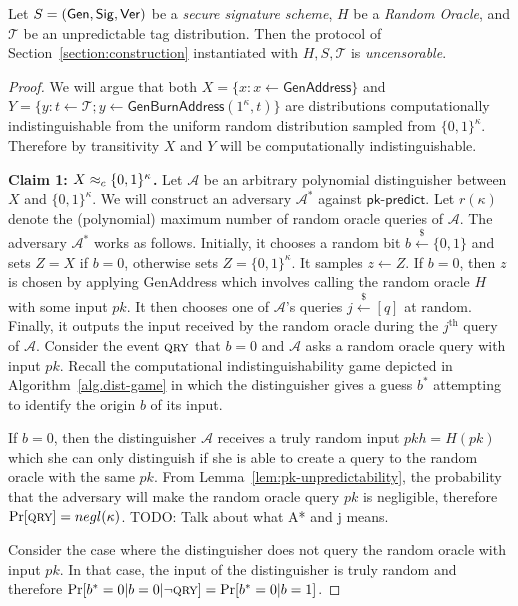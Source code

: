 \begin{theorem}[Uncensorability]
  Let $S = (\mathsf{Gen}, \mathsf{Sig}, \mathsf{Ver})$ be a \emph{secure signature scheme},
  $H$ be a \emph{Random Oracle},
  and $\mathcal{T}$ be an unpredictable tag distribution.
  Then the protocol of Section~\ref{section:construction} instantiated with
  $H, S, \mathcal{T}$ is \emph{uncensorable}.
\end{theorem}
\begin{proof}
  We will argue that both
  $X = \{x: x \gets \textsf{GenAddress}\}$ and
  $Y = \{y: t \gets \mathcal{T}; y \gets \textsf{GenBurnAddress}(1^\kappa, t)\}$ are distributions computationally indistinguishable from the uniform random distribution sampled from $\{0, 1\}^\kappa$. Therefore by transitivity $X$ and $Y$ will be computationally indistinguishable.

  \textbf{Claim 1: $X \approx_c \{0, 1\}^\kappa$.}
  Let $\mathcal{A}$ be an arbitrary polynomial distinguisher between $X$ and $\{0, 1\}^\kappa$. We will construct an adversary $\mathcal{A}^*$ against $\textsf{pk-predict}$. Let $r(\kappa)$ denote the (polynomial) maximum number of random oracle queries of $\mathcal{A}$. The adversary $\mathcal{A}^*$ works as follows. Initially, it chooses a random bit $b \stackrel{\$}{\gets} \{0, 1\}$ and sets $Z = X$ if $b = 0$, otherwise sets $Z = \{0, 1\}^\kappa$.
  It samples $z \gets Z$. If $b = 0$, then $z$ is chosen by applying \textsf{GenAddress} which involves calling the random oracle $H$ with some input $pk$. It then chooses one of $\mathcal{A}$'s queries $j \stackrel{\$}{\gets} [q]$ at random. Finally, it outputs the input received by the random oracle during the $j^\text{th}$ query of $\mathcal{A}$. Consider the event $\textsc{qry}$ that $b = 0$ and $\mathcal{A}$ asks a random oracle query with input $pk$. Recall the computational indistinguishability game depicted in
  Algorithm~\ref{alg.dist-game} in which the distinguisher gives a guess $b^*$
  attempting to identify the origin $b$ of its input.

  If $b = 0$, then the distinguisher $\mathcal{A}$ receives a truly random input
  $pkh = H(pk)$ which she can only distinguish if she is able to create a query
  to the random oracle with the same $pk$. From
  Lemma~\ref{lem:pk-unpredictability}, the probability that the adversary will
  make the random oracle query $pk$ is negligible, therefore $\Pr[\textsc{qry}] =
  negl(\kappa)$.
  TODO: Talk about what A* and j means.

  Consider the case where the distinguisher does not query the random oracle
  with input $pk$. In that case, the input of the distinguisher is truly random
  and therefore $\Pr[b^* = 0|b = 0|\lnot \textsc{qry}] = \Pr[b^* = 0|b = 1]$.


\end{proof}
